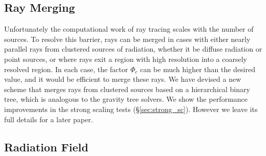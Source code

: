 \documentclass[12pt,preprint]{aastex}
\begin{document}
\subsection{Ray Merging}

Unfortunately the computational work of ray tracing scales with the
number of sources.  To resolve this barrier, rays can be merged in
cases with either nearly parallel rays from clustered sources of
radiation, whether it be diffuse radiation or point sources, or where
rays exit a region with high resolution into a coarsely resolved
region.  In each case, the factor $\Phi_c$ can be much higher than the
desired value, and it would be efficient to merge these rays.  We have
devised a new scheme that merges rays from clustered sources based on
a hierarchical binary tree, which is analogous to the gravity tree
solvers.  We show the performance improvements in the strong scaling
tests (\S\ref{sec:strong_sc}).  However we leave its full details for
a later paper.

\subsection{Radiation Field}
\end{document}
